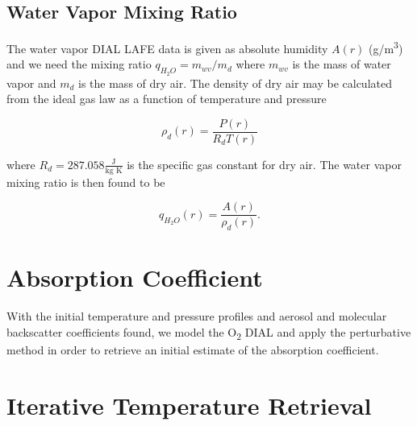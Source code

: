\documentclass[twoside]{article}
\begin{document}
\subsection{Water Vapor Mixing Ratio}

The water vapor DIAL LAFE data is given as absolute humidity $A(r)$ (g/m\textsuperscript{3}) and we need the mixing ratio $q_{H_2O} = m_{wv}/m_d$ where $m_{wv}$ is the mass of water vapor and $m_{d}$ is the mass of dry air.
The density of dry air may be calculated from the ideal gas law as a function of temperature and pressure

\begin{equation}
	\rho_d(r) = \frac{P(r)}{R_d T(r)}
\end{equation}

\noindent where $R_d = 287.058 \frac{\text{J}}{\text{kg K}}$ is the specific gas constant for dry air. The water vapor mixing ratio is then found to be

\begin{equation}
	q_{H_2O}(r) = \frac{A(r)}{\rho_d(r)}.
\end{equation}

\section{Absorption Coefficient}

With the initial temperature and pressure profiles and aerosol and molecular backscatter coefficients found, we model the O\textsubscript{2} DIAL and apply the perturbative method in order to retrieve an initial estimate of the absorption coefficient.

\section{Iterative Temperature Retrieval}
\end{document}
